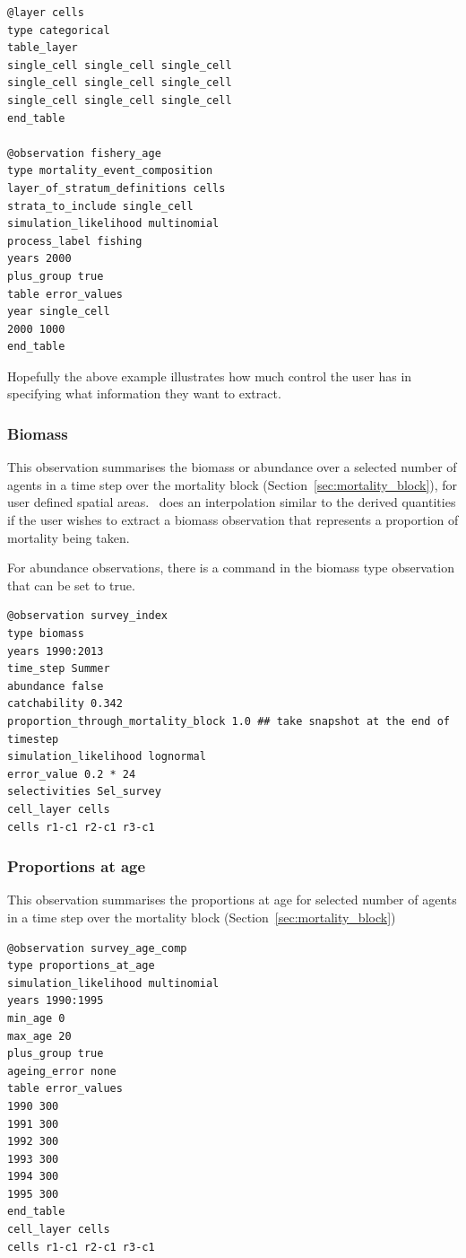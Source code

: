 {\small{\begin{verbatim}
@layer cells
type categorical
table_layer
single_cell single_cell single_cell
single_cell single_cell single_cell
single_cell single_cell single_cell
end_table

@observation fishery_age
type mortality_event_composition
layer_of_stratum_definitions cells
strata_to_include single_cell
simulation_likelihood multinomial
process_label fishing
years 2000
plus_group true
table error_values
year single_cell
2000 1000
end_table
\end{verbatim}}}

Hopefully the above example illustrates how much control the user has in specifying what information they want to extract.

\subsubsection{Biomass}\label{subsubsec:biomass}
This observation summarises the biomass or abundance over a selected number of agents in a time step over the mortality block (Section~\ref{sec:mortality_block}), for user defined spatial areas. \IBM\ does an interpolation similar to the derived quantities if the user wishes to extract a biomass observation that represents a proportion of mortality being taken. 


For abundance observations, there is a command  in the biomass type observation that can be set to true.

{\small{\begin{verbatim}
@observation survey_index
type biomass
years 1990:2013
time_step Summer
abundance false
catchability 0.342
proportion_through_mortality_block 1.0 ## take snapshot at the end of timestep
simulation_likelihood lognormal
error_value 0.2 * 24
selectivities Sel_survey
cell_layer cells
cells r1-c1 r2-c1 r3-c1 
\end{verbatim}}}

\subsubsection{Proportions at age}\label{subsubsec:Proportions_at_age}
This observation summarises the proportions at age for selected number of agents in a time step over the mortality block (Section~\ref{sec:mortality_block})

{\small{\begin{verbatim}
@observation survey_age_comp
type proportions_at_age
simulation_likelihood multinomial
years 1990:1995
min_age 0
max_age 20
plus_group true
ageing_error none
table error_values
1990 300
1991 300
1992 300
1993 300
1994 300
1995 300
end_table
cell_layer cells
cells r1-c1 r2-c1 r3-c1
\end{verbatim}}}


